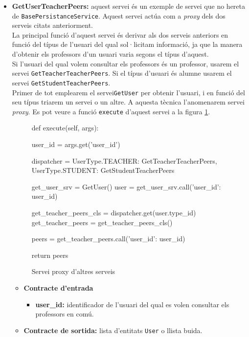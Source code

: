 \begin{itemize}
			\item \textbf{GetUserTeacherPeers:} aquest servei és un exemple de servei que no hereta de \texttt{BasePersistanceService}. Aquest servei actúa com a \emph{proxy} dels dos serveis citats anteriorment.\\
			
			 La principal funció d'aquest servei és derivar als dos serveis anteriors en funció del típus de l'usuari del qual sol·licitam informació,  ja que la manera d'obtenir els professors d'un usuari varia segons el típus d'aquest. \\
			 
			 Si l'usuari del qual volem consultar els professors és un professor, usarem el servei \texttt{GetTeacherTeacherPeers}. Si el típus d'usuari és alumne usarem el servei \texttt{GetStudentTeacherPeers}.\\
			 
			  Primer de tot emplearem el servei\texttt{GetUser} per obtenir l'usuari, i en funció del seu típus triarem un servei o un altre. A aquesta tècnica l'anomenarem servei \emph{proxy}. Es pot veure a funció \texttt{execute} d'aquest servei a la figura \ref{fig:proxy_srv}.
			
			\begin{figure}[h!]
				\begin{python}
def execute(self, args):
	
	user_id = args.get('user_id')
	
	dispatcher = {
		UserType.TEACHER: GetTeacherTeacherPeers,
		UserType.STUDENT: GetStudentTeacherPeers
	}
	
	get_user_srv = GetUser()
	user = get_user_srv.call({'user_id': user_id})
	
	get_teacher_peers_cls = dispatcher.get(user.type_id)
	get_teacher_peers = get_teacher_peers_cls()
	
	peers = get_teacher_peers.call({'user_id': user_id})
	
	return peers
				\end{python}
				\label{fig:proxy_srv}
				\caption{Servei proxy d'altres serveis}
			\end{figure}
			
			\begin{itemize}
					\item \textbf{Contracte d'entrada}
						\begin{itemize}
							\item \textbf{user\_id:} identificador de l'usuari del qual es volen consultar els professors en comú.
						\end{itemize}
					\item \textbf{Contracte de sortida:} lista d'entitats \texttt{User} o llista buida.
				\end{itemize}
				

\end{itemize}
